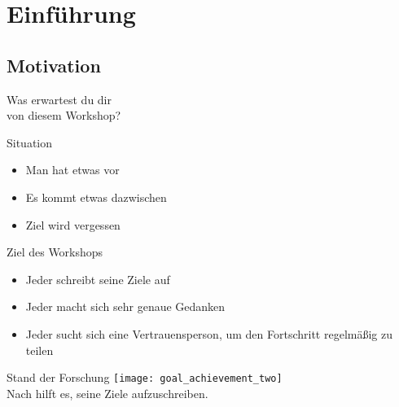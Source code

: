\section{Einführung}

\subsection{Motivation}


\addtocounter{framenumber}{1}
\begin{frame}[standout]
    \LARGE
    Was erwartest du dir \\
    von diesem Workshop?
\end{frame}


\begin{frame}[c]{Situation}
    \Large
    \begin{itemize}[<+(1)->]
        \item Man hat etwas vor
        \item Es kommt etwas dazwischen
        \item Ziel wird vergessen
    \end{itemize}
\end{frame}

\begin{frame}[c]{Ziel des Workshops}
    \Large
    \begin{itemize}[<+(1)->]
        \item Jeder schreibt seine Ziele auf
        \item Jeder macht sich sehr genaue Gedanken
        \item Jeder sucht sich eine Vertrauensperson, um den Fortschritt regelmäßig zu teilen
    \end{itemize}
\end{frame}



\begin{frame}[c]{Stand der Forschung}
    \texttt{[image: goal\_achievement\_two]} \\
    Nach \cite{better-goals-2} hilft es, seine Ziele aufzuschreiben.
\end{frame}

